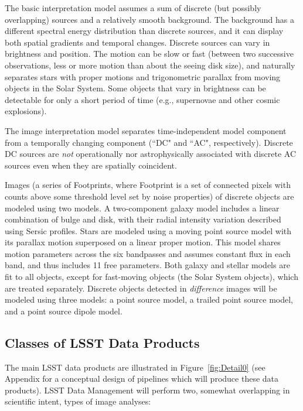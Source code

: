 \documentclass[12pt]{article}
\begin{document}
The basic interpretation model assumes a sum of discrete (but possibly overlapping)
sources and a relatively smooth background. The background has a different
spectral energy distribution than discrete sources, and it can display both
spatial gradients and temporal changes. Discrete sources can vary
in brightness and position. The motion can be slow or fast (between two successive observations,
less or more motion than about the seeing disk size), and naturally separates stars
with proper motions and trigonometric parallax from moving objects in the Solar System.
Some objects that vary in brightness can be detectable for only a short period of time
(e.g., supernovae and other cosmic explosions).

The image interpretation model separates time-independent model
component from a temporally changing component (``DC" and ``AC",
respectively). Discrete DC sources are {\it not} operationally nor astrophysically
associated with discrete AC sources even when they are spatially coincident.

Images (a series of Footprints, where Footprint is a set of connected pixels with
counts above some threshold level set by noise properties) of discrete objects are
modeled using two models. A two-component galaxy model includes a linear
combination of bulge and disk, with their radial intensity variation described using
Sersic profiles.
Stars are modeled using a moving point source model with its parallax motion
superposed on a linear proper motion. This model shares motion parameters across
the six bandpasses and assumes constant flux in each band, and thus includes
11 free parameters. Both galaxy and stellar models are fit to all objects, except
for fast-moving objects (the Solar System objects), which are treated separately.
Discrete objects detected in {\em difference} images will be modeled using three models:
a point source model, a trailed point source model, and a point source dipole model.

\subsection{Classes of LSST Data Products}

The main LSST data products are illustrated in Figure~\ref{fig:Detail0} (see Appendix for
a conceptual design of pipelines which will produce these data products).
LSST Data Management will perform two, somewhat overlapping in scientific intent, types of image analyses:
\end{document}
